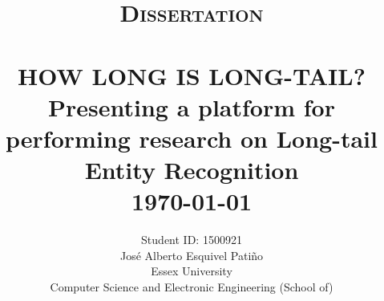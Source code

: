 \title{ \normalsize \textsc{Dissertation}
		\\ [2.0cm]
		\HRule{0.5pt} \\
		\LARGE \textbf{\uppercase{How long is long-tail?}} \\ 
		Presenting a platform for performing research on Long-tail Entity Recognition 
		\HRule{2pt} \\ [0.5cm]
        \normalsize \today \vspace*{5\baselineskip}}
\date{}

\author{
		Student ID: 1500921 \\ 
        José Alberto Esquivel Patiño \\
		Essex University \\
		Computer Science and Electronic Engineering (School of)}


\maketitle



